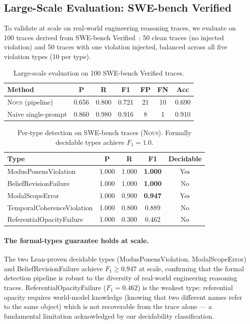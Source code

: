 \documentclass[11pt]{article}
\newcommand{\nous}{\textsc{Nous}} %
\begin{document}
\subsection{Large-Scale Evaluation: SWE-bench Verified}
\label{sec:swebench}

To validate at scale on real-world engineering reasoning traces, we
evaluate on 100 traces derived from SWE-bench Verified~\citep{swebench2024}:
50 clean traces (no injected violation) and 50 traces with one violation
injected, balanced across all five violation types (10 per type).

\begin{table}[h]
\centering
\caption{Large-scale evaluation on 100 SWE-bench Verified traces.}
\label{tab:swebench}
\begin{tabular}{@{}lcccccc@{}}
\toprule
\textbf{Method} & \textbf{P} & \textbf{R} & \textbf{F1} & \textbf{FP} & \textbf{FN} & \textbf{Acc} \\
\midrule
\nous{} (pipeline) & 0.656 & 0.800 & 0.721 & 21 & 10 & 0.690 \\
Naive single-prompt & 0.860 & 0.980 & 0.916 & 8 & 1 & 0.910 \\
\bottomrule
\end{tabular}
\end{table}

\begin{table}[h]
\centering
\caption{Per-type detection on SWE-bench traces (\nous{}). Formally decidable types achieve $F_1 = 1.0$.}
\label{tab:swebench_pertype}
\begin{tabular}{@{}lcccc@{}}
\toprule
\textbf{Type} & \textbf{P} & \textbf{R} & \textbf{F1} & \textbf{Decidable} \\
\midrule
ModusPonensViolation       & 1.000 & 1.000 & \textbf{1.000} & Yes \\
BeliefRevisionFailure      & 1.000 & 1.000 & \textbf{1.000} & No  \\
ModalScopeError            & 1.000 & 0.900 & \textbf{0.947} & Yes \\
TemporalCoherenceViolation & 1.000 & 0.800 & 0.889 & No  \\
ReferentialOpacityFailure  & 1.000 & 0.300 & 0.462 & No  \\
\bottomrule
\end{tabular}
\end{table}

\paragraph{The formal-types guarantee holds at scale.}
The two Lean-proven decidable types (ModusPonensViolation, ModalScopeError)
and BeliefRevisionFailure achieve $F_1 \geq 0.947$ at scale, confirming
that the formal detection pipeline is robust to the diversity of
real-world engineering reasoning traces.
ReferentialOpacityFailure ($F_1 = 0.462$) is the weakest type:
referential opacity requires world-model knowledge (knowing that two
different names refer to the same object) which is not recoverable
from the trace alone — a fundamental limitation acknowledged by our
decidability classification.
\end{document}
